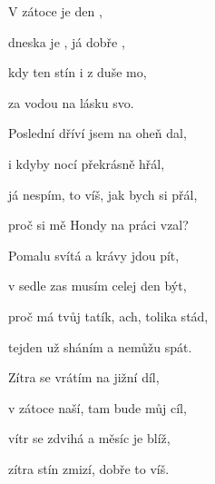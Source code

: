 

\zs
V zátoce  je  den ,

dneska je , já dobře ,

kdy ten stín  i z duše mo,

za vodou  na lásku svo.
\ks

\zs
Poslední dříví jsem na oheň dal,

i kdyby nocí překrásně hřál,

já nespím, to víš, jak bych si přál,

proč si mě Hondy na práci vzal?
\ks

\zs
Pomalu svítá a krávy jdou pít,

v sedle zas musím celej den být,

proč má tvůj tatík, ach, tolika stád,

tejden už sháním a nemůžu spát.
\ks

\zs
Zítra se vrátím na jižní díl,

v zátoce naší, tam bude můj cíl,

vítr se zdvihá a měsíc je blíž,

zítra stín zmizí, dobře to víš.
\ks

\kp























